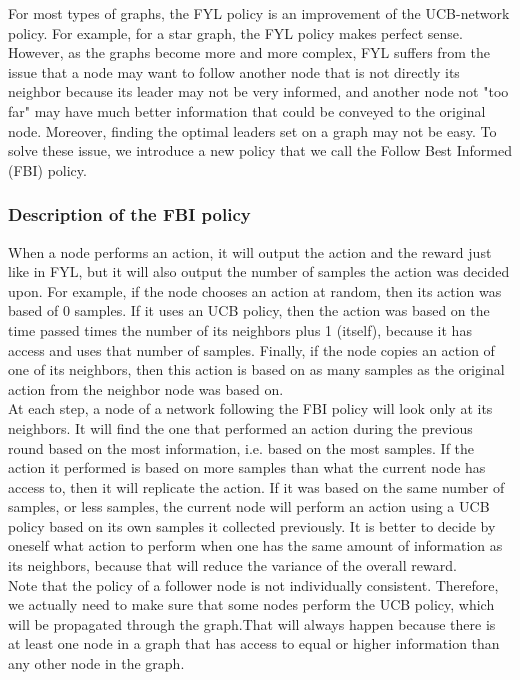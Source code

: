 \documentclass{article}
\begin{document}
For most types of graphs, the FYL policy is an improvement of the UCB-network policy. For example, for a star graph, the FYL policy makes perfect sense. However, as the graphs become more and more complex, FYL suffers from the issue that a node may want to follow another node that is not directly its neighbor because its leader may not be very informed, and another node not "too far" may have much better information that could be conveyed to the original node. Moreover, finding the optimal leaders set on a graph may not be easy. To solve these issue, we introduce a new policy that we call the Follow Best Informed (FBI) policy. \\

\subsubsection{Description of the FBI policy}

When a node performs an action, it will output the action and the reward just like in FYL, but it will also output the number of samples the action was decided upon. For example, if the node chooses an action at random, then its action was based of 0 samples. If it uses an UCB policy, then the action was based on the time passed times the number of its neighbors plus 1 (itself), because it has access and uses that number of samples. Finally, if the node copies an action of one of its neighbors, then this action is based on as many samples as the original action from the neighbor node was based on.  \\

At each step, a node of a network following the FBI policy will look only at its neighbors. It will find the one that performed an action during the previous round based on the most information, i.e. based on the most samples. If the action it performed is based on more samples than what the current node has access to, then it will replicate the action. If it was based on the same number of samples, or less samples, the current node will perform an action using a UCB policy based on its own samples it collected previously. It is better to decide by oneself what action to perform when one has the same amount of information as its neighbors, because that will reduce the variance of the overall reward. \\

Note that the policy of a follower node is not individually consistent. Therefore, we actually need to make sure that some nodes perform the UCB policy, which will be propagated through the graph.That will always happen because there is at least one node in a graph that has access to equal or higher information than any other node in the graph.
\end{document}
